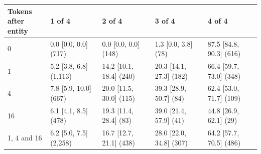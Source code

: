 \begin{tabular}{@{}lllll@{}}
\toprule
\shortstack[l]{Tokens after\\entity} & 1 of 4 & 2 of 4 & 3 of 4 & 4 of 4 \\
\midrule
0 & 0.0 {\scriptsize[0.0, 0.0]} (717) & 0.0 {\scriptsize[0.0, 0.0]} (148) & 1.3 {\scriptsize[0.0, 3.8]} (78) & 87.5 {\scriptsize[84.8, 90.3]} (616) \\
1 & 5.2 {\scriptsize[3.8, 6.8]} (1{,}113) & 14.2 {\scriptsize[10.1, 18.4]} (240) & 20.3 {\scriptsize[14.1, 27.3]} (182) & 66.4 {\scriptsize[59.7, 73.0]} (348) \\
4 & 7.8 {\scriptsize[5.9, 10.0]} (667) & 20.0 {\scriptsize[11.5, 30.0]} (115) & 39.3 {\scriptsize[28.9, 50.7]} (84) & 62.4 {\scriptsize[53.0, 71.7]} (109) \\
16 & 6.1 {\scriptsize[4.1, 8.5]} (478) & 19.3 {\scriptsize[11.4, 28.4]} (83) & 39.0 {\scriptsize[21.4, 57.9]} (41) & 44.8 {\scriptsize[26.9, 62.1]} (29) \\
1, 4 and 16 & 6.2 {\scriptsize[5.0, 7.5]} (2{,}258) & 16.7 {\scriptsize[12.7, 21.1]} (438) & 28.0 {\scriptsize[22.0, 34.8]} (307) & 64.2 {\scriptsize[57.7, 70.5]} (486) \\
\bottomrule
\end{tabular}
